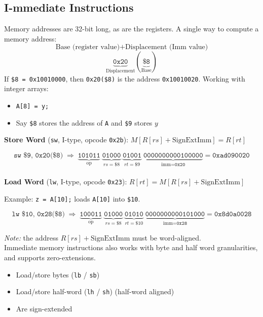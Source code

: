 \documentclass[a4paper, 11pt]{article}
\theoremstyle{definition}
\begin{document}
\newpage
\subsection{\textbf{I}-mmediate Instructions}

Memory addresses are 32-bit long, as are the registers. A single way to compute a memory address:
\[
\text{Base (register value)} + \text{Displacement (Imm value)}
\]
\[
\underbrace{\texttt{0x20}}_{\text{Displacement}}
(\underbrace{\texttt{\$8}}_{\text{Base}})
\]
If \texttt{\$8 = 0x10010000}, then \texttt{0x20(\$8)} is the address \texttt{0x10010020}. Working with integer arrays:
\begin{itemize}
    \item \texttt{A[8] = y;}
    \item Say \texttt{\$8} stores the address of \texttt{A} and \texttt{\$9} stores $y$
\end{itemize}
\textbf{Store Word} (\texttt{sw}, I-type, opcode \texttt{0x2b}):
\quad $M[R[rs] + \mathrm{SignExtImm}] = R[rt]$

\[
\texttt{sw \$9, 0x20(\$8)}
\;\Longrightarrow\;
\underbrace{\texttt{101011}}_{\text{op}}\;
\underbrace{\texttt{01000}}_{rs = \$8}\;
\underbrace{\texttt{01001}}_{rt = \$9}\;
\underbrace{\texttt{0000000000100000}}_{\text{imm} = \texttt{0x20}}
= \texttt{0xad090020}
\] \\
\textbf{Load Word} (\texttt{lw}, I-type, opcode \texttt{0x23}):
\quad $R[rt] = M[R[rs] + \mathrm{SignExtImm}]$

Example: \texttt{z = A[10];} loads \texttt{A[10]} into \texttt{\$10}.

\[
\texttt{lw \$10, 0x28(\$8)}
\;\Longrightarrow\;
\underbrace{\texttt{100011}}_{\text{op}}\;
\underbrace{\texttt{01000}}_{rs = \$8}\;
\underbrace{\texttt{01010}}_{rt = \$10}\;
\underbrace{\texttt{0000000000101000}}_{\text{imm} = \texttt{0x28}}
= \texttt{0x8d0a0028}
\]

\textit{Note:} the address $R[rs] + \mathrm{SignExtImm}$ must be word-aligned. \\

Immediate memory instructions also works with byte and half word granularities, and supports zero-extensions.
\begin{itemize}
    \item Load/store bytes (\texttt{lb} / \texttt{sb})
    \item Load/store half-word (\texttt{lh} / \texttt{sh}) (half-word aligned)
    \item Are sign-extended
\end{itemize}
\end{document}
